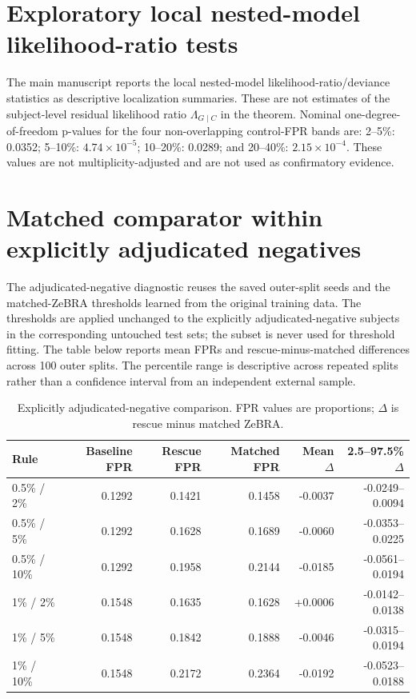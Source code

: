 \documentclass[10pt]{article}
\begin{document}
\section*{Exploratory local nested-model likelihood-ratio tests}
The main manuscript reports the local nested-model likelihood-ratio/deviance statistics as descriptive localization summaries. These are not estimates of the subject-level residual likelihood ratio $\Lambda_{G\mid C}$ in the theorem. Nominal one-degree-of-freedom p-values for the four non-overlapping control-FPR bands are: 2--5\%: 0.0352; 5--10\%: $4.74\times10^{-5}$; 10--20\%: 0.0289; and 20--40\%: $2.15\times10^{-4}$. These values are not multiplicity-adjusted and are not used as confirmatory evidence.

\section*{Matched comparator within explicitly adjudicated negatives}
The adjudicated-negative diagnostic reuses the saved outer-split seeds and the matched-ZeBRA thresholds learned from the original training data. The thresholds are applied unchanged to the explicitly adjudicated-negative subjects in the corresponding untouched test sets; the subset is never used for threshold fitting. The table below reports mean FPRs and rescue-minus-matched differences across 100 outer splits. The percentile range is descriptive across repeated splits rather than a confidence interval from an independent external sample.

\begin{table}[!t]
\caption{Explicitly adjudicated-negative comparison. FPR values are proportions; $\Delta$ is rescue minus matched ZeBRA.}
\centering\small
\begin{tabular}{lrrrrr}
\toprule
Rule & Baseline FPR & Rescue FPR & Matched FPR & Mean $\Delta$ & 2.5--97.5\% $\Delta$\\
\midrule
0.5\% / 2\%  & 0.1292 & 0.1421 & 0.1458 & -0.0037 & -0.0249--0.0094\\
0.5\% / 5\%  & 0.1292 & 0.1628 & 0.1689 & -0.0060 & -0.0353--0.0225\\
0.5\% / 10\% & 0.1292 & 0.1958 & 0.2144 & -0.0185 & -0.0561--0.0194\\
1\% / 2\%    & 0.1548 & 0.1635 & 0.1628 & +0.0006 & -0.0142--0.0138\\
1\% / 5\%    & 0.1548 & 0.1842 & 0.1888 & -0.0046 & -0.0315--0.0194\\
1\% / 10\%   & 0.1548 & 0.2172 & 0.2364 & -0.0192 & -0.0523--0.0188\\
\bottomrule
\end{tabular}
\end{table}
\end{document}
